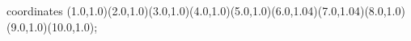					coordinates { (1.0,1.0)(2.0,1.0)(3.0,1.0)(4.0,1.0)(5.0,1.0)(6.0,1.04)(7.0,1.04)(8.0,1.0)(9.0,1.0)(10.0,1.0)};